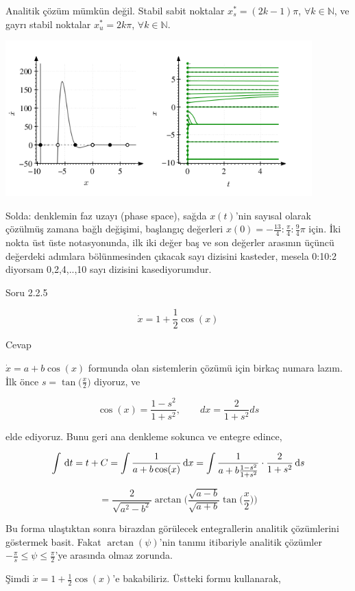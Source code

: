 \documentclass[12pt,fleqn]{article}\usepackage{../../common}
\begin{document}
Analitik çözüm mümkün değil. Stabil sabit noktalar $x^\ast_s = (2k-1)\pi$, $\forall
k \in \mathbb{N}$, ve gayrı stabil noktalar $x^\ast_u = 2k\pi$, $\forall k \in
\mathbb{N}$.

\includegraphics[height=6cm]{03_10.png}

Solda: denklemin faz uzayı (phase space), sağda $x(t)$'nin sayısal olarak
çözülmüş zamana bağlı değişimi, başlangıç değerleri $x(0) =
-\frac{13}{4}:\frac{\pi}{4}:\frac{9}{4}\pi$ için. İki nokta üst üste
notasyonunda, ilk iki değer baş ve son değerler arasının üçüncü değerdeki adımlara
bölünmesinden çıkacak sayı dizisini kasteder, mesela 0:10:2 diyorsam 0,2,4,..,10
sayı dizisini kasediyorumdur. 

Soru 2.2.5

$$\dot{x} = 1 + \frac{1}{2} \cos(x)$$

Cevap

$\dot{x} = a + b \cos(x)$ formunda olan sistemlerin çözümü için birkaç numara
lazım. İlk önce $s = \tan\big(\frac{x}{2}\big)$ diyoruz, ve

$$ \cos(x) = \frac{1-s^2}{1+s^2}, \qquad dx = \frac{2}{1+s^2}ds $$

elde ediyoruz. Bunu geri ana denkleme sokunca ve entegre edince,

$$ \int \,\mathrm{d} t = t + C = \int \frac{1}{a+b\cos(x)} \,\mathrm{d} x =
\int \frac{1}{a + b \frac{1-s^2}{1+s^2}} \cdot \frac{2}{1+s^2} \,\mathrm{d} s
$$

$$ =
\frac{2}{\sqrt{a^2-b^2}} \arctan
\bigg( \frac{\sqrt{a-b}}{\sqrt{a+b}} \tan \bigg( \frac{x}{2} \bigg) \bigg)
$$

Bu forma ulaştıktan sonra birazdan görülecek entegrallerin analitik çözümlerini
göstermek basit. Fakat $\arctan(\psi)$'nin tanımı itibariyle analitik çözümler
$-\frac{\pi}{s} \le \psi \le \frac{\pi}{2}$'ye arasında olmaz zorunda.

Şimdi $\dot{x} = 1 + \frac{1}{2} \cos(x)$'e bakabiliriz. Üstteki formu
kullanarak,
\end{document}
